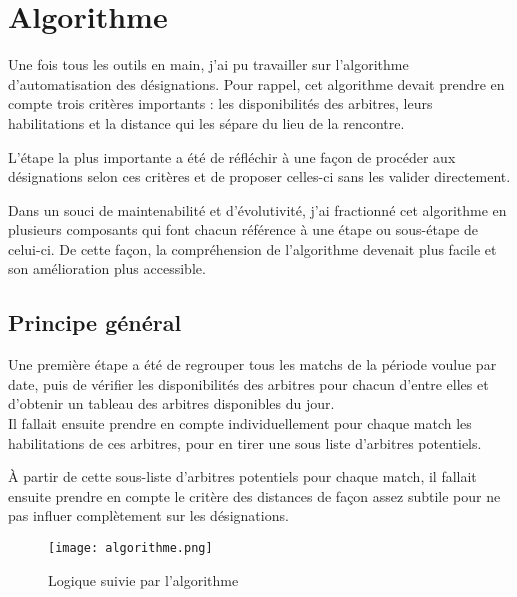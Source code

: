 \section{Algorithme}
\vspace{1cm}

Une fois tous les outils en main, j’ai pu travailler sur l’algorithme d’automatisation des désignations. Pour rappel, cet algorithme devait prendre en compte trois critères importants : les disponibilités des arbitres, leurs habilitations et la distance qui les sépare du lieu de la rencontre.

L’étape la plus importante a été de réfléchir à une façon de procéder aux désignations selon ces critères et de proposer celles-ci sans les valider directement.

Dans un souci de maintenabilité et d’évolutivité, j’ai fractionné cet algorithme en plusieurs composants qui font chacun référence à une étape ou sous-étape de celui-ci. De cette façon, la compréhension de l’algorithme devenait plus facile et son amélioration plus accessible.

\subsection{Principe général}
\vspace{1cm}

Une première étape a été de regrouper tous les matchs de la période voulue par date, puis de vérifier les disponibilités des arbitres pour chacun d’entre elles et d’obtenir un tableau des arbitres disponibles du jour.\\

Il fallait ensuite prendre en compte individuellement pour chaque match les habilitations de ces arbitres, pour en tirer une sous liste d’arbitres potentiels.

À partir de cette sous-liste d’arbitres potentiels pour chaque match, il fallait ensuite prendre en compte le critère des distances de façon assez subtile pour ne pas influer complètement sur les désignations.

\begin{figure}[!h]
    \centering
    \texttt{[image: algorithme.png]}
    \caption{Logique suivie par l'algorithme}
\end{figure}

